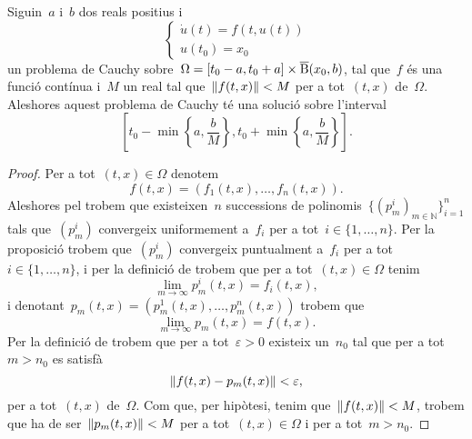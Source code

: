 \documentclass[../../main.tex]{subfiles}
\begin{document}
    \begin{theorem}
        \label{thm:Teorema de Peano}
        Siguin~\(a\) i~\(b\) dos reals positius i
        \begin{equation}
            \label{thm:Teorema de Peano:eq3}
            \begin{cases}
                \displaystyle\dot{u}(t)=f(t,u(t)) \\
                \displaystyle u(t_{0})=x_{0}
            \end{cases}
        \end{equation}
        un problema de Cauchy sobre~\(\Omega=[t_{0}-a,t_{0}+a]\times\overline{\operatorname{B}}(x_{0},b)\), tal que~\(f\) és una funció contínua i~\(M\) un real tal que~\(\norm{f(t,x)}<M\) per a tot~\((t,x)\) de~\(\Omega\).
        Aleshores aquest problema de Cauchy té una solució sobre l'interval
        \[
            \left[t_{0}-\min\left\{a,\frac{b}{M}\right\},t_{0}+\min\left\{a,\frac{b}{M}\right\}\right].
        \]
        \begin{proof} %
            Per a tot~\((t,x)\in\Omega\) denotem
            \[
                f(t,x)=(f_{1}(t,x),\dots,f_{n}(t,x)).
            \]
            Aleshores pel  trobem que existeixen~\(n\) successions de polinomis~\(\{(p_{m}^{i})_{m\in\mathbb{N}}\}_{i=1}^{n}\) tals que~\((p_{m}^{i})\) convergeix uniformement a~\(f_{i}\) per a tot~\(i\in\{1,\dots,n\}\).
            Per la proposició  trobem que~\((p_{m}^{i})\) convergeix puntualment a~\(f_{i}\) per a tot~\(i\in\{1,\dots,n\}\), i per la definició de  trobem que per a tot~\((t,x)\in\Omega\) tenim
            \[
                \lim_{m\to\infty}p_{m}^{i}(t,x)=f_{i}(t,x),
            \]
            i denotant~\(p_{m}(t,x)=(p_{m}^{1}(t,x),\dots,p_{m}^{n}(t,x))\) trobem que
            \begin{equation}
                \label{thm:Teorema de Peano:eq2}
                \lim_{m\to\infty}p_{m}(t,x)=f(t,x).
            \end{equation}
            Per la definició de  trobem que per a tot~\(\varepsilon>0\) existeix un~\(n_{0}\) tal que per a tot~\(m>n_{0}\) es satisfà
            \[
                \norm{f(t,x)-p_{m}(t,x)}<\varepsilon,
            \]
            per a tot~\((t,x)\) de~\(\Omega\).
            Com que, per hipòtesi, tenim que~\(\norm{f(t,x)}<M\), trobem que ha de ser~\(\norm{p_{m}(t,x)}<M\) per a tot~\((t,x)\in\Omega\) i per a tot~\(m>n_{0}\).


\end{proof}
\end{theorem}
\end{document}
